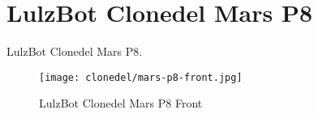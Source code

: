 %
%
%
%
%

\section{LulzBot Clonedel Mars P8}
LulzBot Clonedel Mars P8.

\begin{figure}[h!]
\texttt{[image: clonedel/mars-p8-front.jpg]}
 \caption{LulzBot Clonedel Mars P8 Front}
 \label{fig:clonedel-mars-p8-front}
\end{figure}



